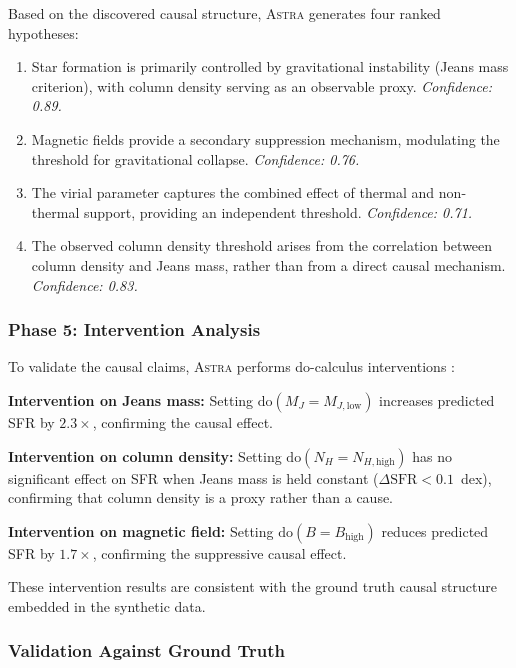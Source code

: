 \documentclass[usenatbib]{rasti}
\newcommand{\astra}{\textsc{Astra}\xspace}
\begin{document}
Based on the discovered causal structure, \astra generates four ranked hypotheses:
\begin{enumerate}
  \item[(H1)] Star formation is primarily controlled by gravitational instability (Jeans mass criterion), with column density serving as an observable proxy. \emph{Confidence: 0.89.}
  \item[(H2)] Magnetic fields provide a secondary suppression mechanism, modulating the threshold for gravitational collapse. \emph{Confidence: 0.76.}
  \item[(H3)] The virial parameter captures the combined effect of thermal and non-thermal support, providing an independent threshold. \emph{Confidence: 0.71.}
  \item[(H4)] The observed column density threshold arises from the correlation between column density and Jeans mass, rather than from a direct causal mechanism. \emph{Confidence: 0.83.}
\end{enumerate}

\subsubsection{Phase 5: Intervention Analysis}
\label{sec:tc6:phase5}

To validate the causal claims, \astra performs do-calculus interventions \citep{Pearl2009}:

\textbf{Intervention on Jeans mass:} Setting $\mathrm{do}(M_J = M_{J,\mathrm{low}})$ increases predicted SFR by $2.3\times$, confirming the causal effect.

\textbf{Intervention on column density:} Setting $\mathrm{do}(N_H = N_{H,\mathrm{high}})$ has no significant effect on SFR when Jeans mass is held constant ($\Delta\mathrm{SFR} < 0.1$~dex), confirming that column density is a proxy rather than a cause.

\textbf{Intervention on magnetic field:} Setting $\mathrm{do}(B = B_\mathrm{high})$ reduces predicted SFR by $1.7\times$, confirming the suppressive causal effect.

These intervention results are consistent with the ground truth causal structure embedded in the synthetic data.

\subsubsection{Validation Against Ground Truth}
\label{sec:tc6:validation}
\end{document}
